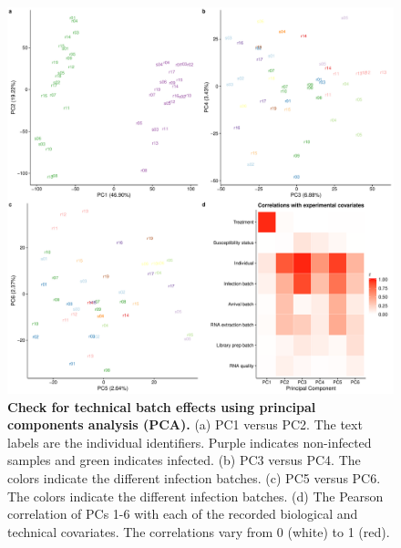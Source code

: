 \begin{figure}[!htb]
\centering \includegraphics[width=5in]{img/ch03/batch-pca.pdf}
\caption[Check for technical batch effects using principal components
  analysis (PCA).]{ \textbf{Check for technical batch effects using
    principal components analysis (PCA).} (a) PC1 versus PC2. The text
  labels are the individual identifiers. Purple indicates non-infected
  samples and green indicates infected. (b) PC3 versus PC4. The colors
  indicate the different infection batches. (c) PC5 versus PC6. The
  colors indicate the different infection batches. (d) The Pearson
  correlation of PCs 1-6 with each of the recorded biological and
  technical covariates. The correlations vary from 0 (white) to 1
  (red).  }
\label{fig:batch-effect}
\end{figure}

